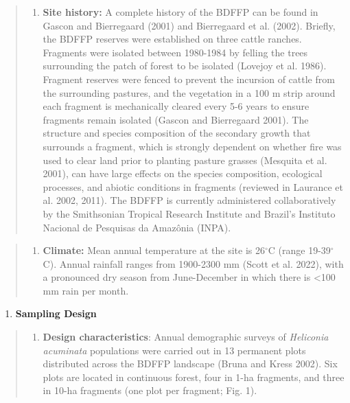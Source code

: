 \documentclass[
  man, donotrepeattitle,floatsintext]{apa6}
\providecommand{\tightlist}{%
  \setlength{\itemsep}{0pt}\setlength{\parskip}{0pt}}
\begin{document}
\begin{quote}
\begin{enumerate}
\def\labelenumi{\alph{enumi}.}
\setcounter{enumi}{5}
\tightlist
\item
  \textbf{Site history:} A complete history of the BDFFP can be found in Gascon and Bierregaard (2001) and Bierregaard et al. (2002). Briefly, the BDFFP reserves were established on three cattle ranches. Fragments were isolated between 1980-1984 by felling the trees surrounding the patch of forest to be isolated (Lovejoy et al. 1986). Fragment reserves were fenced to prevent the incursion of cattle from the surrounding pastures, and the vegetation in a 100 m strip around each fragment is mechanically cleared every 5-6 years to ensure fragments remain isolated (Gascon and Bierregaard 2001). The structure and species composition of the secondary growth that surrounds a fragment, which is strongly dependent on whether fire was used to clear land prior to planting pasture grasses (Mesquita et al. 2001), can have large effects on the species composition, ecological processes, and abiotic conditions in fragments (reviewed in Laurance et al. 2002, 2011). The BDFFP is currently administered collaboratively by the Smithsonian Tropical Research Institute and Brazil's Instituto Nacional de Pesquisas da Amazônia (INPA).
\end{enumerate}
\end{quote}

\begin{quote}
\begin{enumerate}
\def\labelenumi{\alph{enumi}.}
\setcounter{enumi}{6}
\tightlist
\item
  \textbf{Climate:} Mean annual temperature at the site is 26\(^\circ\)C (range 19-39\(^\circ\)C). Annual rainfall ranges from 1900-2300 mm (Scott et al. 2022), with a pronounced dry season from June-December in which there is \textless100 mm rain per month.
\end{enumerate}
\end{quote}

\begin{enumerate}
\def\labelenumi{\arabic{enumi}.}
\setcounter{enumi}{1}
\tightlist
\item
  \textbf{Sampling Design}
\end{enumerate}

\begin{quote}
\begin{enumerate}
\def\labelenumi{\alph{enumi}.}
\tightlist
\item
  \textbf{Design characteristics}: Annual demographic surveys of \emph{Heliconia acuminata} populations were carried out in 13 permanent plots distributed across the BDFFP landscape (Bruna and Kress 2002). Six plots are located in continuous forest, four in 1-ha fragments, and three in 10-ha fragments (one plot per fragment; Fig. 1).
\end{enumerate}
\end{quote}
\end{document}
